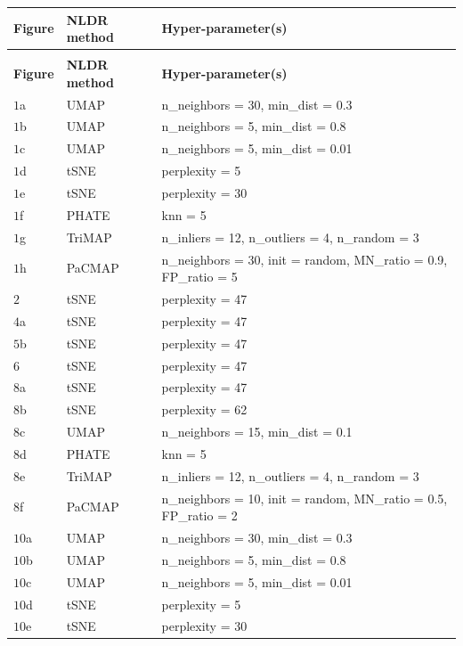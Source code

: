 \documentclass[
  12pt]{article}
\begin{document}
\begin{longtable}{>{\raggedright\arraybackslash}p{1.5cm}>{\raggedright\arraybackslash}p{2cm}>{\raggedright\arraybackslash}p{10cm}}

\toprule
\textbf{Figure} & \textbf{NLDR method} & \textbf{Hyper-parameter(s)}\\
\midrule
\endfirsthead
\multicolumn{3}{@{}l}{\textit{(continued)}}\\
\toprule
\textbf{Figure} & \textbf{NLDR method} & \textbf{Hyper-parameter(s)}\\
\midrule
\endhead

\endfoot
\bottomrule
\endlastfoot
$1$a & UMAP & n\_neighbors = 30, min\_dist = 0.3\\
$1$b & UMAP & n\_neighbors = 5, min\_dist = 0.8\\
$1$c & UMAP & n\_neighbors = 5, min\_dist = 0.01\\
$1$d & tSNE & perplexity = 5\\
$1$e & tSNE & perplexity = 30\\
$1$f & PHATE & knn = 5\\
$1$g & TriMAP & n\_inliers = 12, n\_outliers = 4, n\_random = 3\\
$1$h & PaCMAP & n\_neighbors = 30, init = random, MN\_ratio = 0.9, FP\_ratio = 5\\
\midrule
$2$ & tSNE & perplexity = 47\\
$4$a & tSNE & perplexity = 47\\
$5$b & tSNE & perplexity = 47\\
$6$ & tSNE & perplexity = 47\\
\midrule
$8$a & tSNE & perplexity = 47\\
$8$b & tSNE & perplexity = 62\\
$8$c & UMAP & n\_neighbors = 15, min\_dist = 0.1\\
$8$d & PHATE & knn = 5\\
$8$e & TriMAP & n\_inliers = 12, n\_outliers = 4, n\_random = 3\\
$8$f & PaCMAP & n\_neighbors = 10, init = random, MN\_ratio = 0.5, FP\_ratio = 2\\
\midrule
$10$a & UMAP & n\_neighbors = 30, min\_dist = 0.3\\
$10$b & UMAP & n\_neighbors = 5, min\_dist = 0.8\\
$10$c & UMAP & n\_neighbors = 5, min\_dist = 0.01\\
$10$d & tSNE & perplexity = 5\\
$10$e & tSNE & perplexity = 30\\

\end{longtable}
\end{document}
